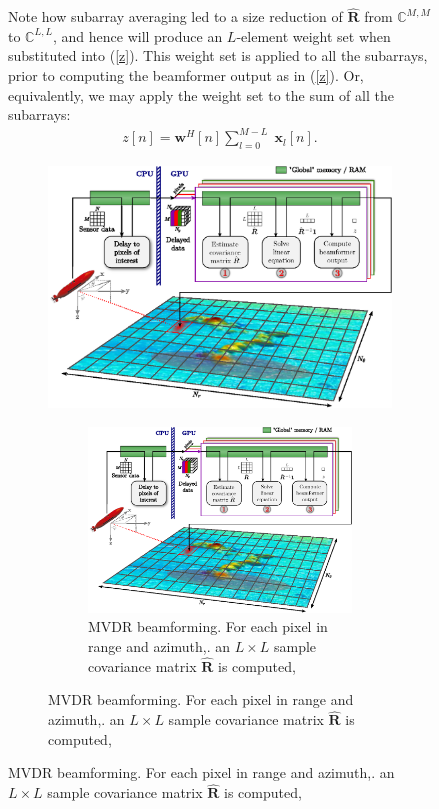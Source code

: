\documentclass[12pt,journal,draftclsnofoot,onecolumn]{IEEEtran}
\let\MYoriglatexcaption\caption               %
\renewcommand{\caption}[2][\relax]{\MYoriglatexcaption[#2]{#2}}
\newcommand\sumb[2]{\sum\limits_{#1}^{#2}\;}
\renewcommand\H{^{\scriptscriptstyle H}}
\renewcommand\vec[1]{\boldsymbol{#1}}
\newcommand\mat[1]{\boldsymbol{#1}}
\newcommand\1{\vec 1}
\newcommand*\w{\vec w}
\newcommand*\x{\vec x}
\newcommand*\eR{\mat{\hat R}}
\begin{document}
\begin{figure}[H]
Note how subarray averaging led to a size reduction of $\eR$ from $\mathbb{C}^{M,M}$ to $\mathbb{C}^{L,L}$, and hence will produce an $L$-element weight set when substituted into (\ref{z}). This weight set is applied to all the subarrays, prior to computing the beamformer output as in (\ref{z}). Or, equivalently, we may apply the weight set to the sum of all the subarrays:
\begin{align}
z[n] = \w\H[n] \sumb{l=0}{M-L} \x_l[n].\label{finalZ}
\end{align}
\ifPeerReview
\begin{figure}[!t]\centering
\includegraphics[width=.8\linewidth]{gfx/buske2.eps}
\else
\begin{figure}[!t]\centering
\includegraphics[width=\linewidth]{gfx/implementation.eps}
\fi%
\caption{MVDR beamforming. For each pixel in range and azimuth,\newline
1. an $L\times{}L$ sample covariance matrix $\eR$ is computed, \newline
}
\end{figure}
\end{figure}
\end{figure}
\end{document}
